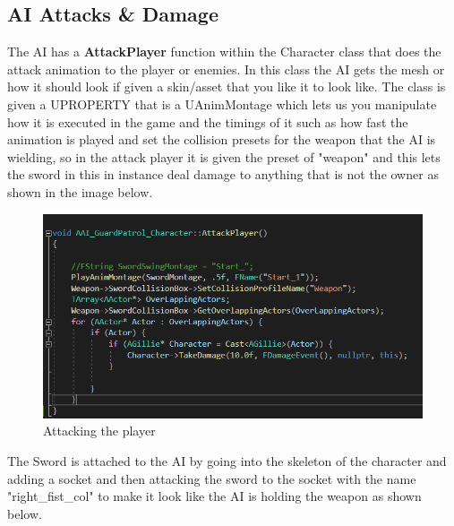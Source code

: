 \subsection{AI Attacks \& Damage}
The AI has a \textbf{AttackPlayer} function within the Character class that does the attack animation to the player or enemies. In this class the AI gets the mesh or how it should look if given a skin/asset that you like it to look like. The class is given a UPROPERTY that is a UAnimMontage which lets us you manipulate how it is executed in the game and the timings of it such as how fast the animation is played and set the collision presets for the weapon that the AI is wielding, so in the attack player it is given the preset of "weapon" and this lets the sword in this in instance deal damage to anything that is not the owner as shown in the image below. 
\begin{figure}[H]
    \centering
    \includegraphics[scale=.5]{img/AttackPlayer.PNG}
    \caption{Attacking the player}
    \label{AI Waypoint}
\end{figure}
The Sword is attached to the AI by going into the skeleton of the character and adding a socket and then attacking the sword to the socket with the name "right\_fist\_col" to make it look like the AI is holding the weapon as shown below.
